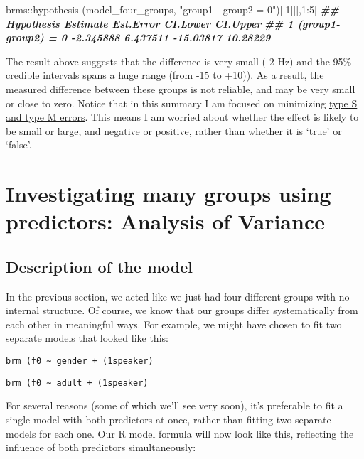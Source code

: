 \documentclass[
]{book}
\newenvironment{Shaded}{\begin{snugshade}}{\end{snugshade}}
\newcommand{\DecValTok}[1]{\textcolor[rgb]{0.00,0.00,0.81}{#1}}
\newcommand{\DocumentationTok}[1]{\textcolor[rgb]{0.56,0.35,0.01}{\textbf{\textit{#1}}}}
\newcommand{\FunctionTok}[1]{\textcolor[rgb]{0.00,0.00,0.00}{#1}}
\newcommand{\NormalTok}[1]{#1}
\newcommand{\SpecialCharTok}[1]{\textcolor[rgb]{0.00,0.00,0.00}{#1}}
\newcommand{\StringTok}[1]{\textcolor[rgb]{0.31,0.60,0.02}{#1}}
\begin{document}
\begin{Shaded}
\begin{Highlighting}[]
\NormalTok{brms}\SpecialCharTok{::}\FunctionTok{hypothesis}\NormalTok{ (model\_four\_groups, }\StringTok{"group1 {-} group2 = 0"}\NormalTok{)[[}\DecValTok{1}\NormalTok{]][,}\DecValTok{1}\SpecialCharTok{:}\DecValTok{5}\NormalTok{]}
\DocumentationTok{\#\#            Hypothesis  Estimate Est.Error  CI.Lower CI.Upper}
\DocumentationTok{\#\# 1 (group1{-}group2) = 0 {-}2.345888  6.437511 {-}15.03817 10.28229}
\end{Highlighting}
\end{Shaded}

The result above suggests that the difference is very small (-2 Hz) and the 95\% credible intervals spans a huge range (from -15 to +10)). As a result, the measured difference between these groups is not reliable, and may be very small or close to zero. Notice that in this summary I am focused on minimizing \href{https://statmodeling.stat.columbia.edu/2004/12/29/type_1_type_2_t/}{type S and type M errors}. This means I am worried about whether the effect is likely to be small or large, and negative or positive, rather than whether it is `true' or `false'.

\hypertarget{investigating-many-groups-using-predictors-analysis-of-variance}{%
\section{Investigating many groups using predictors: Analysis of Variance}\label{investigating-many-groups-using-predictors-analysis-of-variance}}

\hypertarget{description-of-the-model-3}{%
\subsection{Description of the model}\label{description-of-the-model-3}}

In the previous section, we acted like we just had four different groups with no internal structure. Of course, we know that our groups differ systematically from each other in meaningful ways. For example, we might have chosen to fit two separate models that looked like this:

\texttt{brm\ (f0\ \textasciitilde{}\ gender\ +\ (1\textbar{}speaker)}

\texttt{brm\ (f0\ \textasciitilde{}\ adult\ +\ (1\textbar{}speaker)}

For several reasons (some of which we'll see very soon), it's preferable to fit a single model with both predictors at once, rather than fitting two separate models for each one. Our R model formula will now look like this, reflecting the influence of both predictors simultaneously:
\end{document}
